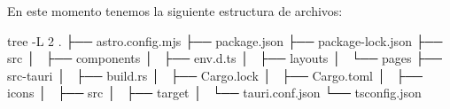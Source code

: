En este momento tenemos la siguiente estructura de archivos:
\begin{multicli}
\cliarrow tree -L 2 \newline
.  \newline
├── astro.config.mjs \newline
├── package.json \newline
├── package-lock.json \newline
├── src \newline
│   ├── components  \newline
│   ├── env.d.ts \newline
│   ├── layouts \newline
│   └── pages \newline
├── src-tauri \newline
│   ├── build.rs \newline
│   ├── Cargo.lock \newline
│   ├── Cargo.toml \newline
│   ├── icons \newline
│   ├── src \newline
│   ├── target \newline
│   └── tauri.conf.json \newline
└── tsconfig.json
\end{multicli}
